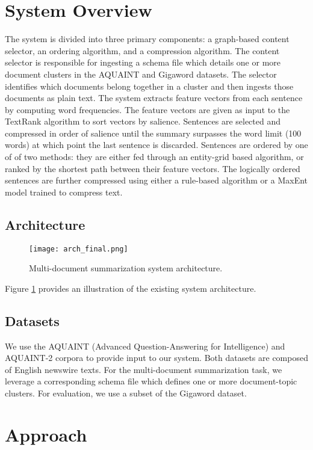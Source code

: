 \documentclass[11pt]{article}
\begin{document}
\section{System Overview}
The system is divided into three primary components: a graph-based content selector, an ordering algorithm, and a compression algorithm. The content selector is responsible for ingesting a schema file which details one or more document clusters in the AQUAINT and Gigaword datasets. The selector identifies which documents belong together in a cluster and then ingests those documents as plain text. The system extracts feature vectors from each sentence by computing word frequencies. The feature vectors are given as input to the  TextRank algorithm to sort vectors by salience. Sentences are selected and compressed in order of salience until the summary surpasses the word limit (100 words) at which point the last sentence is discarded. Sentences are ordered by one of of two methods: they are either fed through an entity-grid based algorithm, or ranked by the shortest path between their feature vectors. The logically ordered sentences are further compressed using either a rule-based algorithm or a MaxEnt model trained to compress text.

\subsection{Architecture}
\begin{figure}
  \texttt{[image: arch\_final.png]}
  \caption{Multi-document summarization system architecture.}
  \label{fig:arch}
\end{figure}

Figure \ref{fig:arch} provides an illustration of the existing system architecture.

\subsection{Datasets}
We use the AQUAINT (Advanced Question-Answering for Intelligence) and AQUAINT-2 corpora to provide input to our system. Both datasets are composed of English newswire texts. For the multi-document summarization task, we leverage a corresponding schema file which defines one or more document-topic clusters. For evaluation, we use a subset of the Gigaword dataset.

\section{Approach}
\end{document}

